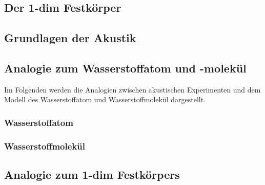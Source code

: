 \subsection{Der 1-dim Festkörper}
\label{sec:festkoerper}



\subsection{Grundlagen der Akustik}
\label{sec:akustik}



\subsection{Analogie zum Wasserstoffatom und -molekül}
\label{sec:analogien}

Im Folgenden werden die Analogien zwischen akustischen Experimenten und dem Modell des Wasserstoffatom und Wasserstoffmolekül dargestellt.

\subsubsection{Wasserstoffatom}
\label{sec:ana-H}



\subsubsection{Wasserstoffmolekül}
\label{sec:ana-H2}



\subsection{Analogie zum 1-dim Festkörpers}
\label{ana-fest}

